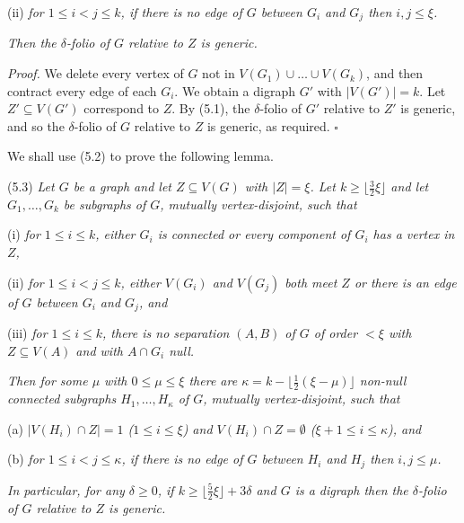 \hspace*{12pt}(ii) \textit{for $1 \le i < j \le k$, if there is no edge of $G$ between $G_i$ and $G_j$ then $i, j \le \xi$.}

\textit{Then the $\delta$-folio of $G$ relative to $Z$ is generic.}

\textit{Proof.} We delete every vertex of $G$ not in $V(G_1) \cup \dots \cup V(G_k)$, and then contract every edge of each $G_i$. We obtain a digraph $G'$ with $|V(G')| = k$. Let $Z' \subseteq V(G')$ correspond to $Z$. By (5.1), the $\delta$-folio of $G'$ relative to $Z'$ is generic, and so the $\delta$-folio of $G$ relative to $Z$ is generic, as required. $\square$

We shall use (5.2) to prove the following lemma.

\stmt
(5.3) \textit{Let $G$ be a graph and let $Z \subseteq V(G)$ with $|Z| = \xi$. Let $k \ge \lfloor \frac{3}{2}\xi \rfloor$ and let $G_1, \dots, G_k$ be subgraphs of $G$, mutually vertex-disjoint, such that}

\hspace*{12pt}(i) \textit{for $1 \le i \le k$, either $G_i$ is connected or every component of $G_i$ has a vertex in $Z$,}

\hspace*{12pt}(ii) \textit{for $1 \le i < j \le k$, either $V(G_i)$ and $V(G_j)$ both meet $Z$ or there is an edge of $G$ between $G_i$ and $G_j$, and}

\hspace*{12pt}(iii) \textit{for $1 \le i \le k$, there is no separation $(A, B)$ of $G$ of order $< \xi$ with $Z \subseteq V(A)$ and with $A \cap G_i$ null.}

\textit{Then for some $\mu$ with $0 \le \mu \le \xi$ there are $\kappa = k - \lfloor \frac{1}{2}(\xi - \mu) \rfloor$ non-null connected subgraphs $H_1, \dots, H_\kappa$ of $G$, mutually vertex-disjoint, such that}

\hspace*{12pt}(a) \textit{$|V(H_i) \cap Z| = 1$ ($1 \le i \le \xi$) and $V(H_i) \cap Z = \emptyset$ ($\xi + 1 \le i \le \kappa$), and}

\hspace*{12pt}(b) \textit{for $1 \le i < j \le \kappa$, if there is no edge of $G$ between $H_i$ and $H_j$ then $i, j \le \mu$.}

\textit{In particular, for any $\delta \ge 0$, if $k \ge \lfloor \frac{5}{2}\xi \rfloor + 3\delta$ and $G$ is a digraph then the $\delta$-folio of $G$ relative to $Z$ is generic.}

